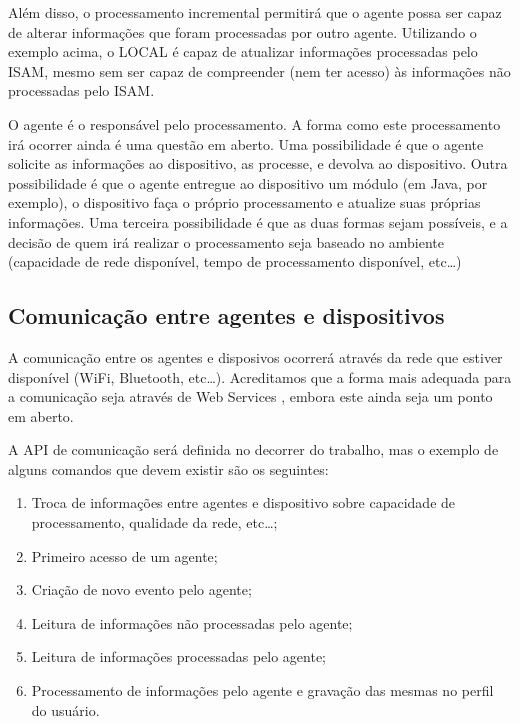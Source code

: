 \documentclass[a4paper, twocolumn]{article}
\begin{document}
Além disso, o processamento incremental permitirá que o agente possa ser capaz de alterar informações que foram processadas por outro agente. Utilizando o exemplo acima, o LOCAL é capaz de atualizar informações processadas pelo ISAM, mesmo sem ser capaz de compreender (nem ter acesso) às informações não processadas pelo ISAM.

O agente é o responsável pelo processamento. A forma como este processamento irá ocorrer ainda é uma questão em aberto. Uma possibilidade é que o agente solicite as informações ao dispositivo, as processe, e devolva ao dispositivo. Outra possibilidade é que o agente entregue ao dispositivo um módulo (em Java, por exemplo), o dispositivo faça o próprio processamento e atualize suas próprias informações. Uma terceira possibilidade é que as duas formas sejam possíveis, e a decisão de quem irá realizar o processamento seja baseado no ambiente (capacidade de rede disponível, tempo de processamento disponível, etc\ldots)


\subsection{Comunicação entre agentes e dispositivos} \label{sec:comunicacao}

A comunicação entre os agentes e disposivos ocorrerá através da rede que estiver disponível (WiFi, Bluetooth, etc\ldots). Acreditamos que a forma mais adequada para a comunicação seja através de Web Services \cite{??}, embora este ainda seja um ponto em aberto.

A API de comunicação será definida no decorrer do trabalho, mas o exemplo de alguns comandos que devem existir são os seguintes:

\begin{enumerate}
  \item Troca de informações entre agentes e dispositivo sobre capacidade de processamento, qualidade da rede, etc\dots;
  \item Primeiro acesso de um agente;
  \item Criação de novo evento pelo agente;
  \item Leitura de informações não processadas pelo agente;
  \item Leitura de informações processadas pelo agente;
  \item Processamento de informações pelo agente e gravação das mesmas no perfil do usuário.
\end{enumerate}
\end{document}
